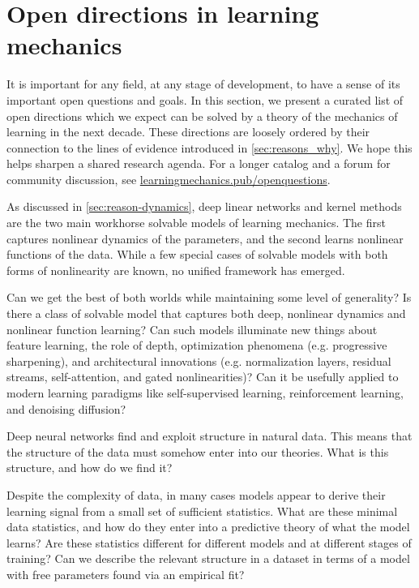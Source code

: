 \section{Open directions in learning mechanics}
\label{sec:open_dirs}

It is important for any field, at any stage of development, to have a sense of its important open questions and goals.
In this section, we present a curated list of open directions which we expect can be solved by a theory of the mechanics of learning in the next decade.
These directions are loosely ordered by their connection to the lines of evidence introduced in \cref{sec:reasons_why}.
We hope this helps sharpen a shared research agenda.
For a longer catalog and a forum for community discussion, see \url{learningmechanics.pub/openquestions}.


\begin{opendirection}
\label{openquestion:models_of_nonlin_learning}

As discussed in \cref{sec:reason-dynamics}, deep linear networks and kernel methods are the two main workhorse solvable models of learning mechanics.
The first captures nonlinear dynamics of the parameters, and the second learns nonlinear functions of the data.
While a few special cases of solvable models with both forms of nonlinearity are known, no unified framework has emerged.

Can we get the best of both worlds while maintaining some level of generality?
Is there a class of solvable model that captures both deep, nonlinear dynamics and nonlinear function learning?
Can such models illuminate new things about feature learning, the role of depth, optimization phenomena (e.g. progressive sharpening), and architectural innovations (e.g. normalization layers, residual streams, self-attention, and gated nonlinearities)?
Can it be usefully applied to modern learning paradigms like self-supervised learning, reinforcement learning, and denoising diffusion?
\end{opendirection}

\begin{opendirection}
\label{openquestion:theory_for_real_data}

Deep neural networks find and exploit structure in natural data.
This means that the structure of the data must somehow enter into our theories.
What is this structure, and how do we find it?

Despite the complexity of data, in many cases models appear to derive their learning signal from a small set of sufficient statistics.
What are these minimal data statistics, and how do they enter into a predictive theory of what the model learns?
Are these statistics different for different models and at different stages of training?
Can we describe the relevant structure in a dataset in terms of a model with free parameters found via an empirical fit?
\end{opendirection}

